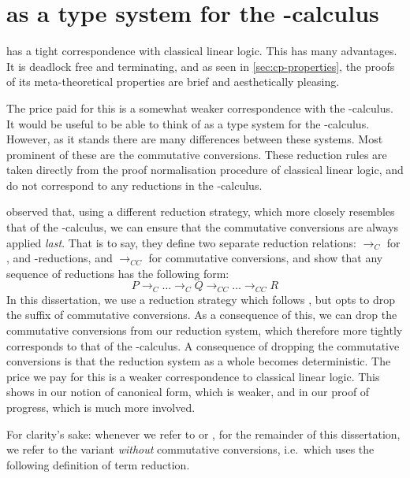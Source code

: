 \chapter{\cp as a type system for the \textpi-calculus}\label{sec:cppi}
\cp has a tight correspondence with classical linear logic.
This has many advantages.
It is deadlock free and terminating, and as seen in \cref{sec:cp-properties},
the proofs of its meta-theoretical properties are brief and aesthetically
pleasing.

The price paid for this is a somewhat weaker correspondence with the
\textpi-calculus.
It would be useful to be able to think of \cp as a type system for the
\textpi-calculus.
However, as it stands there are many differences between these systems.
Most prominent of these are the commutative conversions. These reduction rules
are taken directly from the proof normalisation procedure of classical linear
logic, and do not correspond to any reductions in the \textpi-calculus.

 observed that, using a different reduction
strategy, which more closely resembles that of the \textpi-calculus, we can
ensure that the commutative conversions are always applied \emph{last}.
That is to say, they define two separate reduction relations:
$\longrightarrow_{C}$ for ,  and \textbeta-reductions,
and $\longrightarrow_{CC}$ for commutative conversions, and show that any
sequence of reductions has the following form:
\[
  P \longrightarrow_{C} \dots \longrightarrow_{C} Q \longrightarrow_{CC} \dots \longrightarrow_{CC} R
\]
In this dissertation, we use a reduction strategy which follows
, but opts to drop the suffix of commutative
conversions.
As a consequence of this, we can drop the commutative conversions from our
reduction system, which therefore more tightly corresponds to that of the
\textpi-calculus. 
A consequence of dropping the commutative conversions is that the reduction
system as a whole becomes deterministic.
The price we pay for this is a weaker correspondence to classical linear logic.
This shows in our notion of canonical form, which is weaker, and in our proof of
progress, which is much more involved.

For clarity's sake: whenever we refer to \cp or \rcp, for the remainder of this
dissertation, we refer to the variant \emph{without} commutative conversions,
i.e.\ which uses the following definition of term reduction.


